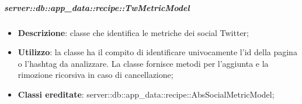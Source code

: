 		\subparagraph{server::db::app\_data::recipe::TwMetricModel} %
		\label{subp:server_db_app_data_recipe_twmetricmodel}
			\begin{itemize}
				\item \textbf{Descrizione}: classe che identifica le metriche dei social Twitter;
				\item \textbf{Utilizzo}: la classe ha il compito di identificare univocamente l'id della pagina o l'hashtag da analizzare. La classe fornisce metodi per l'aggiunta e la rimozione ricorsiva in caso di cancellazione;
				\item \textbf{Classi ereditate}: server::db::app\_data::recipe::AbsSocialMetricModel;
			\end{itemize}
